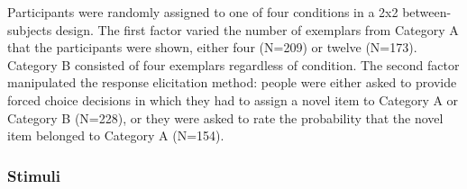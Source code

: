 \documentclass[doc,apacite]{apa6}
\begin{document}
Participants were randomly assigned to one of four conditions in a 2x2 between-subjects design. The first factor varied the number of exemplars from Category A that the participants were shown, either {\sc four} (N=209) or {\sc twelve} (N=173). Category B consisted of four exemplars regardless of condition. The second factor manipulated the response elicitation method: people were either  asked to provide {\sc forced choice} decisions in which they had to assign a novel item to Category A or Category B (N=228), or they were asked to rate the {\sc probability} that the novel item belonged to Category A (N=154).



\begin{figure}[ht]
\end{figure}


\subsubsection{Stimuli}
\end{document}
